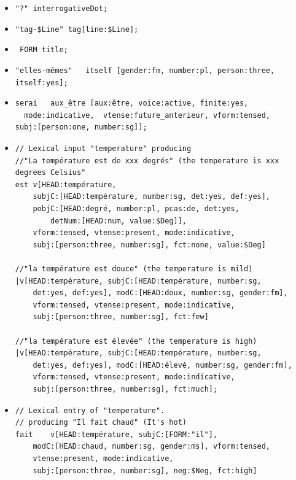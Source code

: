 \documentclass[11pt]{article}
\begin{document}
\begin{itemize}
	\item \verb#"?" interrogativeDot;#

	      \bigskip
	\item \verb#"tag-$Line" tag[line:$Line]; #

	      \bigskip
	\item \verb# FORM title; #

	      \bigskip
	\item \verb#"elles-mêmes"	itself [gender:fm, number:pl, person:three, itself:yes]; #

	      \bigskip
	\item \begin{verbatim}
serai	aux_être [aux:être, voice:active, finite:yes,
  mode:indicative,  vtense:future_anterieur, vform:tensed, 
subj:[person:one, number:sg]]; 
\end{verbatim}

	      \bigskip
	\item \begin{verbatim}
// Lexical input "temperature" producing 
//"La température est de xxx degrés" (the temperature is xxx degrees Celsius"
est v[HEAD:température, 
	subjC:[HEAD:température, number:sg, det:yes, def:yes], 
	pobjC:[HEAD:degré, number:pl, pcas:de, det:yes,
		detNum:[HEAD:num, value:$Deg]], 
	vform:tensed, vtense:present, mode:indicative, 
	subj:[person:three, number:sg], fct:none, value:$Deg]

//"la température est douce" (the temperature is mild)
|v[HEAD:température, subjC:[HEAD:température, number:sg, 
	det:yes, def:yes], modC:[HEAD:doux, number:sg, gender:fm],
	vform:tensed, vtense:present, mode:indicative, 
	subj:[person:three, number:sg], fct:few]

//"la température est élevée" (the temperature is high)
|v[HEAD:température, subjC:[HEAD:température, number:sg, 
	det:yes, def:yes], modC:[HEAD:élevé, number:sg, gender:fm],
	vform:tensed, vtense:present, mode:indicative, 
	subj:[person:three, number:sg], fct:much];
\end{verbatim}

	      \bigskip
	\item \begin{verbatim}
// Lexical entry of "temperature".
// producing "Il fait chaud" (It's hot)
fait	v[HEAD:température, subjC:[FORM:"il"], 
	modC:[HEAD:chaud, number:sg, gender:ms], vform:tensed,
	vtense:present, mode:indicative, 
	subj:[person:three, number:sg], neg:$Neg, fct:high]


\end{verbatim}
\end{itemize}
\end{document}
